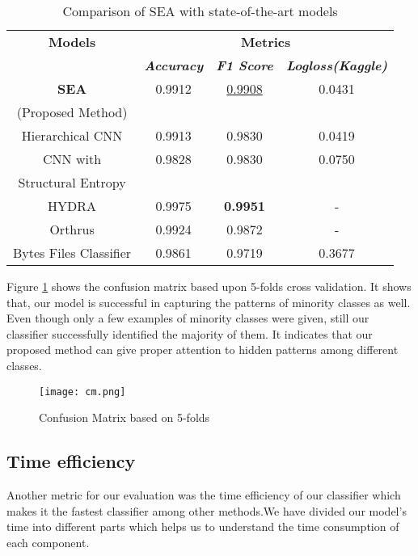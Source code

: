 \documentclass[conference]{IEEEtran}
\begin{document}
\begin{table}[htbp]
\caption{Comparison of SEA with state-of-the-art models}
\begin{center}
\begin{tabular}{|c|c|c|c|}
\hline
\textbf{Models}&\multicolumn{3}{|c|}{\textbf{Metrics}} \\
\cline{2-4} 
& \textbf{\textit{Accuracy}}& \textbf{\textit{F1 Score}}& \textbf{\textit{Logloss(Kaggle)}} \\

\hline
\textbf{SEA} &0.9912 &\underline{0.9908} &0.0431  \\
(Proposed Method) &  &  & \\
\hline
\hline
Hierarchical CNN \cite{b5}&0.9913 &0.9830 &0.0419  \\
\hline
\hline
CNN with &0.9828 &0.9830 &0.0750  \\
Structural Entropy \cite{b6}& & & \\ 
\hline
\hline
HYDRA \cite{b3}&0.9975 &\textbf{0.9951} &-  \\
\hline
\hline
Orthrus \cite{b4}&0.9924 &0.9872 &-  \\
\hline
\hline
Bytes Files Classifier \cite{b7}&0.9861 &0.9719 &0.3677  \\
\hline
\end{tabular}
\label{tab1}
\end{center}
\end{table}

Figure \ref{fig10} shows the confusion matrix based upon 5-folds cross validation. It shows that, our model is successful in capturing the patterns of minority classes as well. Even though only a few examples of minority classes were given, still our classifier successfully identified the majority of them. It indicates that our proposed method can give proper attention to hidden patterns among different classes.

\begin{figure}[htbp]
\centerline{\texttt{[image: cm.png]}}
\caption{Confusion Matrix based on 5-folds}
\label{fig10}
\end{figure}

\subsection{Time efficiency}
Another metric for our evaluation was the time efficiency of our classifier which makes it the fastest classifier among other methods.We have divided our model’s time into different parts which helps us to understand the time consumption of each component.
\end{document}
